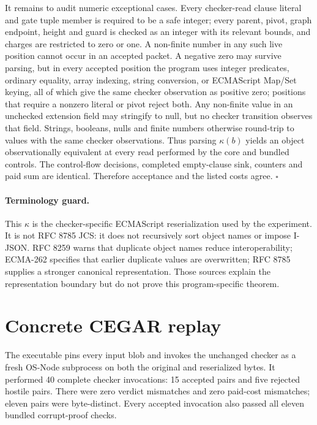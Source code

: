 \documentclass[11pt]{article}
\begin{document}
It remains to audit numeric exceptional cases.  Every checker-read clause
literal and gate tuple member is required to be a safe integer; every parent,
pivot, graph endpoint, height and guard is checked as an integer with its
relevant bounds, and charges are restricted to zero or one.  A non-finite
number in any such live position cannot occur in an accepted packet.  A
negative zero may survive parsing, but in every accepted position the program
uses integer predicates, ordinary equality, array indexing, string conversion,
or ECMAScript Map/Set keying, all of which give the same checker observation as
positive zero; positions that require a nonzero literal or pivot reject both.
Any non-finite value in an unchecked extension field may stringify to null,
but no checker transition observes that field.  Strings, booleans, nulls and
finite numbers otherwise round-trip to values with the same checker
observations.  Thus parsing $\kappa(b)$ yields an object observationally
equivalent at every read performed by the core and bundled controls.  The
control-flow decisions, completed empty-clause sink, counters and paid sum are
identical.  Therefore acceptance and the listed costs agree. \(\square\)

\paragraph{Terminology guard.}
This $\kappa$ is the checker-specific ECMAScript reserialization used by the
experiment.  It is not RFC 8785 JCS: it does not recursively sort object names
or impose I-JSON.  RFC 8259 warns that duplicate object names reduce
interoperability; ECMA-262 specifies that earlier duplicate values are
overwritten; RFC 8785 supplies a stronger canonical representation.  Those
sources explain the representation boundary but do not prove this
program-specific theorem.

\section{Concrete CEGAR replay}
The executable
pins every input blob and invokes the unchanged checker as a fresh OS-Node
subprocess on both the original and reserialized bytes.  It performed 40
complete checker invocations: 15 accepted pairs and five rejected hostile
pairs.  There were zero verdict mismatches and zero paid-cost mismatches;
eleven pairs were byte-distinct.  Every accepted invocation also passed all
eleven bundled corrupt-proof checks.
\end{document}
